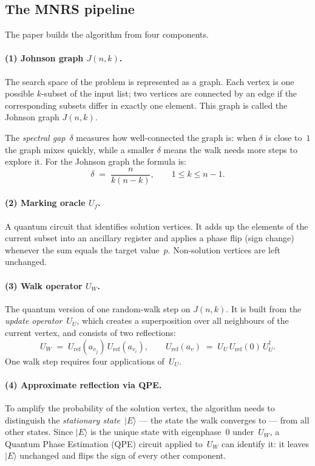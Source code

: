 \documentclass[11pt,a4paper]{article}
\begin{document}
\subsection{The MNRS pipeline}

The paper builds the algorithm from four components.

\paragraph{(1) Johnson graph $J(n,k)$.}
The search space of the problem is represented as a graph. Each vertex is one possible $k$-subset of the input list; two vertices are connected by an edge if the corresponding subsets differ in exactly one element. This graph is called the Johnson graph $J(n,k)$.

The \emph{spectral gap}~$\delta$ measures how well-connected the graph is: when $\delta$ is close to~$1$ the graph mixes quickly, while a smaller $\delta$ means the walk needs more steps to explore it. For the Johnson graph the formula is:
\[
\delta \;=\; \frac{n}{k(n-k)} , \qquad 1 \le k \le n-1 .
\]

\paragraph{(2) Marking oracle $U_f$.}
A quantum circuit that identifies solution vertices. It adds up the elements of the current subset into an ancillary register and applies a phase flip (sign change) whenever the sum equals the target value~$p$. Non-solution vertices are left unchanged.

\paragraph{(3) Walk operator $U_W$.}
The quantum version of one random-walk step on $J(n,k)$. It is built from the \emph{update operator}~$U_U$, which creates a superposition over all neighbours of the current vertex, and consists of two reflections:
\[
U_W \;=\; U_{\mathrm{ref}}(a_{v_j})\, U_{\mathrm{ref}}(a_{v_i}),
\qquad
U_{\mathrm{ref}}(a_v) \;=\; U_U \, U_{\mathrm{ref}}(0) \, U_U^{\dagger}.
\]
One walk step requires four applications of~$U_U$.

\paragraph{(4) Approximate reflection via QPE.}
To amplify the probability of the solution vertex, the algorithm needs to distinguish the \emph{stationary state}~$|E\rangle$ --- the state the walk converges to --- from all other states. Since $|E\rangle$ is the unique state with eigenphase~$0$ under~$U_W$, a Quantum Phase Estimation (QPE) circuit applied to~$U_W$ can identify it: it leaves $|E\rangle$ unchanged and flips the sign of every other component.
\end{document}

